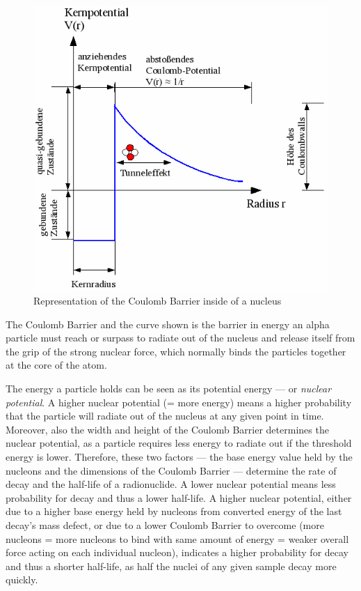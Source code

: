 \begin{figure}[h!]
  \centering
  \includegraphics[scale=0.7]{img/coulomb}
  \caption{Representation of the Coulomb Barrier inside of a nucleus}
  \label{fig:coulomb}
\end{figure}

The Coulomb Barrier and the curve shown is the barrier in energy an alpha particle must reach or surpass to radiate out of the nucleus and release itself from the grip of the strong nuclear force, which normally binds the particles together at the core of the atom. 

The energy a particle holds can be seen as its potential energy --- or \emph{nuclear potential}. A higher nuclear potential (= more energy) means a higher probability that the particle will radiate out of the nucleus at any given point in time. Moreover, also the width and height of the Coulomb Barrier determines the nuclear potential, as a particle requires less energy to radiate out if the threshold energy is lower. Therefore, these two factors --- the base energy value held by the nucleons and the dimensions of the Coulomb Barrier --- determine the rate of decay and the half-life of a radionuclide. A lower nuclear potential means less probability for decay and thus a lower half-life. A higher nuclear potential, either due to a higher base energy held by nucleons from converted energy of the last decay's mass defect, or due to a lower Coulomb Barrier to overcome (more nucleons = more nucleons to bind with same amount of energy = weaker overall force acting on each individual nucleon), indicates a higher probability for decay and thus a shorter half-life, as half the nuclei of any given sample decay more quickly. 

